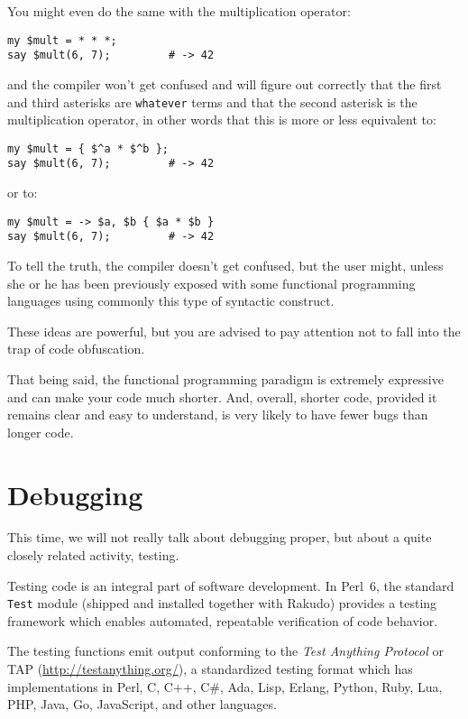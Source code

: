 You might even do the same with the multiplication operator:

\begin{verbatim}
my $mult = * * *;
say $mult(6, 7);         # -> 42
\end{verbatim}

and the compiler won't get confused and will figure out 
correctly that the first and third asterisks are 
\verb'whatever' terms and that the second asterisk is 
the multiplication operator, in other words that this is 
more or less equivalent to:

\begin{verbatim}
my $mult = { $^a * $^b };
say $mult(6, 7);         # -> 42
\end{verbatim}

or to:

\begin{verbatim}
my $mult = -> $a, $b { $a * $b }
say $mult(6, 7);         # -> 42  
\end{verbatim}

To tell the truth, the compiler doesn't get confused, 
but the user might, unless she or he has been previously 
exposed with some functional programming languages using 
commonly this type of syntactic construct. 

These ideas are powerful, but you are advised to pay 
attention not to fall into the trap of code obfuscation.

That being said, the functional programming paradigm 
is extremely expressive and can make your code much 
shorter. And, overall, shorter code, provided it remains 
clear and easy to understand, is very likely to have 
fewer bugs than longer code.

\section{Debugging}
\label{test_module}

This time, we will not really talk about debugging proper, 
but about a quite closely related activity, testing.

Testing code is an integral part of software development. In 
Perl~6, the standard {\tt Test} module (shipped and installed 
together with Rakudo) provides a testing framework which enables 
automated, repeatable verification of code behavior.

The testing functions emit output conforming to the \emph{Test 
Anything Protocol} or TAP (\url{http://testanything.org/}), a 
standardized testing format which has implementations in Perl, 
C, C++, C\#, Ada, Lisp, Erlang, Python, Ruby, Lua, PHP, Java, 
Go, JavaScript, and other languages.

